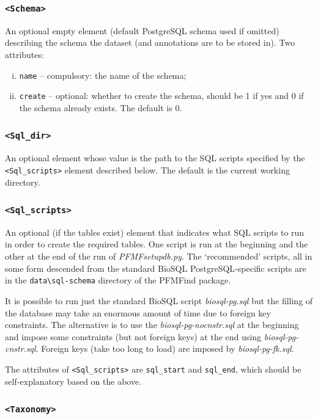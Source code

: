 \documentclass[11pt]{article}
\begin{document}
\subsubsection*{{\tt <Schema>}}

An optional empty element (default PostgreSQL schema used if omitted) describing the schema the dataset (and annotations are to be stored in). Two attributes:
\begin{enumerate}[(i)]
\item {\tt name} -- compulsory: the name of the schema;
\item {\tt create} -- optional: whether to create the schema, should be 1 if yes and 0 if the schema already exists. The default is 0.
\end{enumerate}

\subsubsection*{{\tt <Sql\_dir>}}

An optional element whose value is the path to the SQL scripts specified by the {\tt <Sql\_scripts>} element described below. The default is the current working directory.

\subsubsection*{{\tt <Sql\_scripts>}}

An optional (if the tables exist) element that indicates what SQL scripts to run in order to create the required tables. One script is run at the beginning and the other at the end of the run of {\it PFMFsetupdb.py}. The `recommended' scripts, all in some form descended from the standard BioSQL PostgreSQL-specific scripts are in the \verb|data\sql-schema| directory of the PFMFind package.

It is possible to run just the standard BioSQL script {\it biosql-pg.sql} but the filling of the database  may take an enormous amount of time due to foreign key constraints. The alternative is to use the {\it biosql-pg-nocnstr.sql} at the beginning and impose some constraints (but not foreign keys) at the end using {\it biosql-pg-cnstr.sql}. Foreign keys (take too long to load) are imposed by {\it biosql-pg-fk.sql}. 

The attributes of {\tt <Sql\_scripts>} are {\tt sql\_start} and {\tt sql\_end}, which should be self-explanatory based on the above.

\subsubsection*{{\tt <Taxonomy>}}
\end{document}
